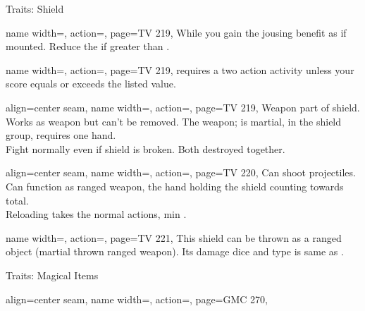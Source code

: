 \begin{PageBack}
\begin{Tables}{\backTableHeight}
\begin{Table}{Traits: Shield}
\begin{entry}{}{%
                name width=\conditionLength,%
                action=\Harnessed,
                page=TV 219,
            }
                While  you gain the jousing benefit as if mounted.
                Reduce the   \Feet if greater than  \Feet.
            \end{entry}
            \begin{entry}{}{%
                name width=\conditionLength,%
                action=\Hefty,
                page=TV 219,
            }
                 requires a two action activity unless your \Strength score equals or exceeds the listed value.
            \end{entry}
            \begin{entry}{}{%
                align=center seam,
                name width=\conditionLength,%
                action=\Integrated,
                page=TV 219,
            }
                Weapon part of shield.
                Works as  weapon but can't be removed.
                The weapon; is martial, in the shield group, requires one hand. \\
                Fight normally even if shield is broken.
                Both destroyed together.
            \end{entry}
            \begin{entry}{}{%
                align=center seam,
                name width=\conditionLength,%
                action=\Launching,
                page=TV 220,
            }
                Can shoot projectiles. Can function as ranged weapon, the hand holding the shield counting towards total.\\
                Reloading takes the normal  actions, min .
            \end{entry}
            \begin{entry}{}{%
                name width=\conditionLength,%
                action=\ShieldThrow,
                page=TV 221,
            }
                This shield can be thrown as a ranged object (martial thrown ranged weapon).
                Its damage dice and type is same as .
            \end{entry}
        \end{Table}
        \TableSpace
        \begin{Table}{Traits: Magical Items}
            \begin{entry}{}{%
                align=center seam,
                name width=\conditionLength,%
                action=\Apex,
                page=GMC 270,
            }

\end{entry}
\end{Table}
\end{Tables}
\end{PageBack}
